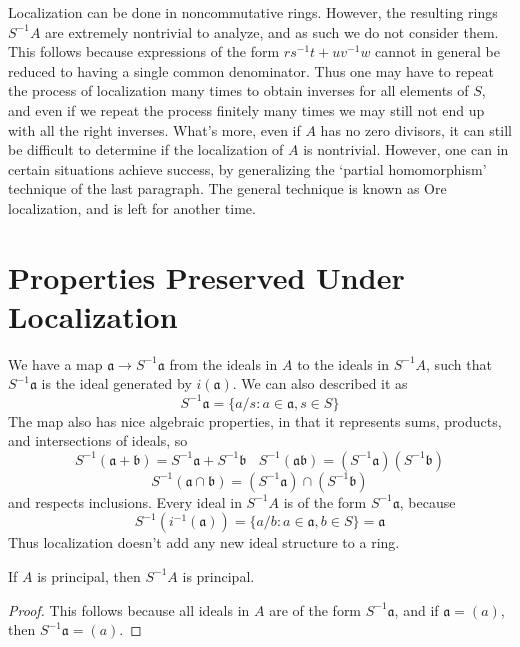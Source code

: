 \begin{remark}
Localization can be done in noncommutative rings. However, the resulting rings $S^{-1}A$ are extremely nontrivial to analyze, and as such we do not consider them. This follows because expressions of the form $rs^{-1}t + uv^{-1}w$ cannot in general be reduced to having a single common denominator. Thus one may have to repeat the process of localization many times to obtain inverses for all elements of $S$, and even if we repeat the process finitely many times we may still not end up with all the right inverses. What's more, even if $A$ has no zero divisors, it can still be difficult to determine if the localization of $A$ is nontrivial. However, one can in certain situations achieve success, by generalizing the `partial homomorphism' technique of the last paragraph. The general technique is known as Ore localization, and is left for another time.
\end{remark}

\section{Properties Preserved Under Localization}

We have a map $\mathfrak{a} \to S^{-1}\mathfrak{a}$ from the ideals in $A$ to the ideals in $S^{-1}A$, such that $S^{-1}\mathfrak{a}$ is the ideal generated by $i(\mathfrak{a})$. We can also described it as
%
\[ S^{-1}\mathfrak{a} = \{ a/s : a \in \mathfrak{a}, s \in S \} \]
%
The map also has nice algebraic properties, in that it represents sums, products, and intersections of ideals, so
%
\[ S^{-1}(\mathfrak{a} + \mathfrak{b}) = S^{-1}\mathfrak{a} + S^{-1}\mathfrak{b}\ \ \ \ S^{-1}(\mathfrak{a} \mathfrak{b}) = (S^{-1} \mathfrak{a})(S^{-1}\mathfrak{b}) \]
\[ S^{-1}(\mathfrak{a} \cap \mathfrak{b}) = (S^{-1} \mathfrak{a}) \cap (S^{-1} \mathfrak{b}) \]
%
and respects inclusions. Every ideal in $S^{-1}A$ is of the form $S^{-1}\mathfrak{a}$, because
%
\[ S^{-1}(i^{-1}(\mathfrak{a})) = \{ a/b : a \in \mathfrak{a}, b \in S \} = \mathfrak{a} \]
%
Thus localization doesn't add any new ideal structure to a ring.

\begin{prop}
    If $A$ is principal, then $S^{-1}A$ is principal.
\end{prop}
\begin{proof}
    This follows because all ideals in $A$ are of the form $S^{-1} \mathfrak{a}$, and if $\mathfrak{a} = (a)$, then $S^{-1}\mathfrak{a} = (a)$.
\end{proof}

